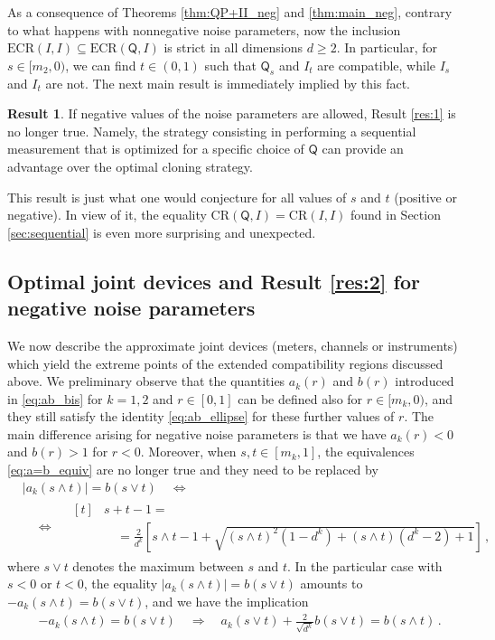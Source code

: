 \documentclass[12pt,reqno]{amsart}
\theoremstyle{definition}
\newcommand{\Qo}{\mathsf{Q}}%
\newtheorem{result}{Result}
\newcommand{\CR}[1]{\textrm{CR} #1} %
\newcommand{\ECR}[1]{\textrm{ECR} #1} %
\begin{document}
As a consequence of Theorems \ref{thm:QP+II_neg} and \ref{thm:main_neg}, contrary to what happens with nonnegative noise parameters, now the inclusion $\ECR{(I,I)}\subseteq\ECR{(\Qo,I)}$ is strict in all dimensions $d\geq 2$. In particular, for $s\in [m_2,0)$, we can find $t\in (0,1)$ such that $\Qo_s$ and $I_t$ are compatible, while $I_s$ and $I_t$ are not. The next main result is immediately implied by this fact.
\begin{result}
If negative values of the noise parameters are allowed, Result \ref{res:1} is no longer true. Namely, the strategy consisting in performing a sequential measurement that is optimized for a specific choice of $\Qo$ can provide an advantage over the optimal cloning strategy.
\end{result}
This result is just what one would conjecture for all values of $s$ and $t$ (positive or negative). In view of it, the equality $\CR{(\Qo,I)} = \CR{(I,I)}$ found in Section \ref{sec:sequential} is even more surprising and unexpected.


\subsection{Optimal joint devices and Result \ref{res:2} for negative noise parameters}\label{sec:ext2}

We now describe the approximate joint devices (meters, channels or instruments) which yield the extreme points of the extended compatibility regions discussed above. We preliminary observe that the quantities $a_k(r)$ and $b(r)$ introduced in \eqref{eq:ab_bis} for $k=1,2$ and $r\in [0,1]$ can be defined also for $r\in [m_k,0)$, and they still satisfy the identity \eqref{eq:ab_ellipse} for these further values of $r$. The main difference arising for negative noise parameters is that we have $a_k(r)<0$ and $b(r)>1$ for $r<0$. Moreover, when $s,t\in [m_k,1]$, the equivalences \eqref{eq:a=b_equiv} are no longer true and they need to be replaced by
\begin{equation}\label{eq:a=b_equiv_neg}
\begin{aligned}
& |a_k(s\wedge t)| = b(s\vee t) \quad\Leftrightarrow\quad \\
& \quad\Leftrightarrow\quad
\begin{aligned}[t]
& s+t-1 = \\
& \quad = \frac{2}{d^k}\left[s\wedge t - 1 + \sqrt{(s\wedge t)^2(1-d^k) + (s\wedge t)(d^k-2) + 1}\right] \,,
\end{aligned}
\end{aligned}
\end{equation}
where $s\vee t$ denotes the maximum between $s$ and $t$. In the particular case with $s<0$ or $t<0$, the equality $|a_k(s\wedge t)| = b(s\vee t)$ amounts to $-a_k(s\wedge t) = b(s\vee t)$, and we have the implication 
\begin{equation}\label{eq:a=b_equiv_neg_neg}
\begin{aligned}
& -a_k(s\wedge t) = b(s\vee t) \quad\Rightarrow\quad a_k(s\vee t) + \frac{2}{\sqrt{d^k}} b(s\vee t) = b(s\wedge t)\,.
\end{aligned}
\end{equation}
\end{document}
